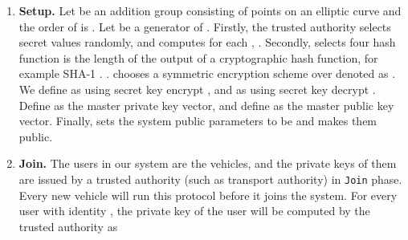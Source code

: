 \documentclass[a4paper]{article}
\begin{document}
\begin{enumerate}
 \item \textbf{Setup.} Let  be an addition group consisting of points on an elliptic curve and the order of  is . Let  be a generator of . Firstly, the trusted authority  selects  secret values  randomly, and computes  for each , . Secondly,  selects four hash function  is the length of the output of a cryptographic hash function, for example SHA-1 . .  chooses a symmetric encryption scheme over  denoted as . We define  as using secret key  encrypt , and  as using secret key  decrypt . Define  as the master private key vector, and define  as the master public key vector. Finally,  sets the system public parameters to be  and makes them public.
 \item \textbf{Join.} The users in our system are the vehicles, and the private keys of them are issued by a trusted authority (such as transport authority) in \texttt{Join} phase. Every new vehicle will run this protocol before it joins the system. For every user with identity , the private key of the user will be computed by the trusted authority as
     

\end{enumerate}
\end{document}
